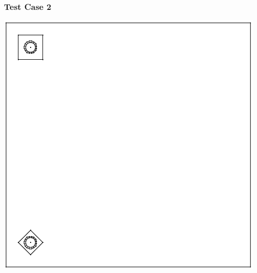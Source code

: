 \documentclass[]{beamer}
\begin{document}
\begin{frame}[t]\frametitle{Test Case 2}
\centering
\includegraphics[scale = 0.4]{figures/unbalanced_pins_same_side-eps-converted-to.pdf}
\end{frame}
\end{document}
